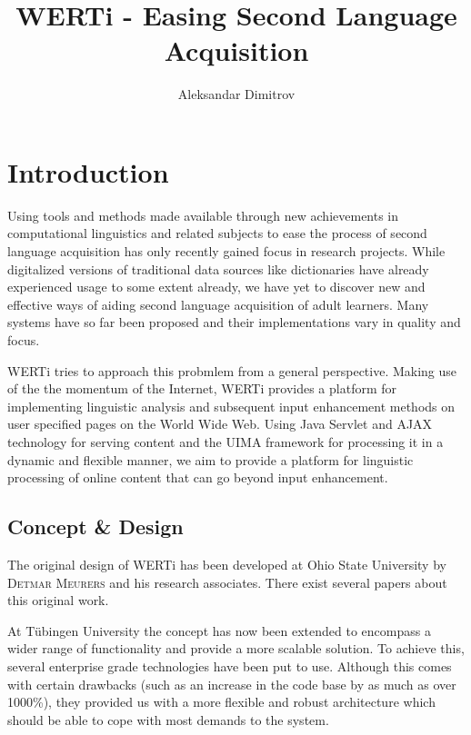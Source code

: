 \documentclass[12pt]{article}
\author{Aleksandar Dimitrov}
\title{WERTi - Easing Second Language Acquisition}
\begin{document}
\maketitle

\tableofcontents

\section{Introduction}

Using tools and methods made available through new achievements in computational
linguistics and related subjects to ease the process of second language
acquisition has only recently gained focus in research projects.  While
digitalized versions of traditional data sources like dictionaries have already
experienced usage to some extent already, we have yet to discover new and
effective ways of aiding second language acquisition of adult learners. Many
systems have so far been proposed and their implementations vary in quality and
focus.

WERTi tries to approach this probmlem from a general perspective. Making
use of the the momentum of the Internet, WERTi provides a platform for
implementing linguistic analysis and subsequent input enhancement methods on
user specified pages on the World Wide Web. Using Java Servlet and AJAX technology for
serving content and the UIMA framework for processing it in a dynamic and
flexible manner, we aim to provide a platform for linguistic processing of
online content that can go beyond input enhancement.


\subsection{Concept \& Design}

The original design of WERTi has been developed at Ohio State University by
\textsc{Detmar Meurers} and his research associates. 
There exist several papers
about this original work. 

At Tübingen University the concept has now been extended
to encompass a wider range of functionality and provide a more scalable
solution. To achieve this, several enterprise grade technologies have been put to
use. Although this comes with certain drawbacks (such as an increase in the
code base by as much as over 1000\%), they provided us with a more flexible and robust
architecture which should be able to cope with most demands to the system.
\end{document}
